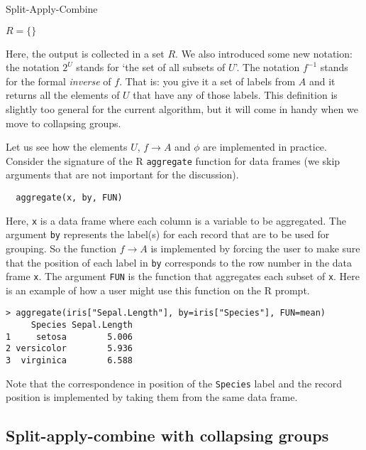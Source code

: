 \documentclass[11pt, fleqn]{article}
\begin{document}
\begin{algorithm}[H]
\caption{Split-Apply-Combine}

$R = \{\}$\;
\end{algorithm}
Here, the output is collected in a set $R$. We also introduced some new
notation: the notation $2^U$ stands for `the set of all subsets of $U$'. The
notation $f^{-1}$ stands for the formal \emph{inverse} of $f$. That is: you
give it a set of labels from $A$ and it returns all the elements of $U$ that
have any of those labels. This definition is slightly too general for the
current algorithm, but it will come in handy when we move to collapsing groups.

Let us see how the elements $U$, $f\to A$ and $\phi$ are implemented
in practice. Consider the signature of the R \texttt{aggregate} function for data
frames (we skip arguments that are not important for the discussion).
\begin{verbatim}
  aggregate(x, by, FUN)
\end{verbatim}
Here, \texttt{x} is a data frame where each column is a variable to be
aggregated.  The argument \texttt{by} represents the label(s) for each record
that are to be used for grouping. So the function $f\to A$ is implemented by
forcing the user to make sure that the position of each label in \texttt{by}
corresponds to the row number in the data frame \texttt{x}. The argument
\texttt{FUN} is the function that aggregates each subset of \texttt{x}.  Here is
an example of how a user might use this function on the R prompt.
%
\begin{verbatim}
> aggregate(iris["Sepal.Length"], by=iris["Species"], FUN=mean)
     Species Sepal.Length
1     setosa        5.006
2 versicolor        5.936
3  virginica        6.588
\end{verbatim}
%
Note that the correspondence in position of the \texttt{Species} label and the
record position is implemented by taking them from the same data frame.


\subsection{Split-apply-combine with collapsing groups}
\end{document}
